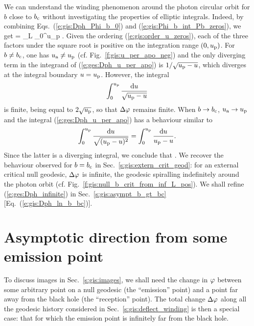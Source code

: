 We can understand the winding phenomenon
around the photon circular orbit for $b$ close to $b_{\rm c}$
without investigating the properties of elliptic integrals.
Indeed, by combining Eqs.~(\ref{e:gis:Dph_Phi_b_0}) and (\ref{e:gis:Phi_b_int_Pb_zeros}),
we get
\be \label{e:ges:Dph_u_per_apo}
    \Delta\ph = \eps_L  \int_0^{u_{\rm p}}
     .
\ee
Given the ordering (\ref{e:gis:order_u_zeros}), each of the
three factors under the square root is positive on the integration range
$(0,u_{\rm p})$. For $b\not=b_{\rm c}$, one has $u_{\rm a}\not=u_{\rm p}$
(cf. Fig.~\ref{f:gis:u_per_apo_neg})
and
the only diverging term in the integrand of (\ref{e:ges:Dph_u_per_apo})
is $1/\sqrt{u_{\rm p} - u}$, which
diverges at the integral boundary $u=u_{\rm p}$. However, the integral
\[
    \int_0^{u_{\rm p}}
    \frac{\mathrm{d} u}{\sqrt{u_{\rm p} - u}}
\]
is finite, being equal to $2\sqrt{u_{\rm p}}$, so that $\Delta\varphi$ remains
finite. When $b\to b_{\rm c}$,
$u_{\rm a} \to u_{\rm p}$ and the integral (\ref{e:ges:Dph_u_per_apo})
has a behaviour similar to
\[
     \int_0^{u_{\rm p}}
    \frac{\mathrm{d} u}{\sqrt{(u_{\rm p} - u)^2}} = \int_0^{u_{\rm p}}
    \frac{\mathrm{d} u}{u_{\rm p} - u} .
\]
Since the latter is a diverging integral, we conclude that
\be \label{e:ges:Dph_infinite}
    .
\ee
We recover the behaviour observed for $b=b_{\rm c}$ in
Sec.~\ref{s:gis:extern_crit_geod}: for
an external critical null geodesic,
$\Delta\varphi$ is infinite, the geodesic spiralling indefinitely around the
photon orbit (cf. Fig.~\ref{f:gis:null_b_crit_from_inf_L_pos}).
We shall refine (\ref{e:ges:Dph_infinite}) in Sec.~\ref{s:gis:asympt_b_gt_bc}
[Eq.~(\ref{e:gis:Dph_ln_b_bc})].


\section{Asymptotic direction from some emission point} \label{s:gis:asymp}

To discuss images in Sec.~\ref{s:gis:images},
we shall need the change in $\varphi$ between some
arbitrary point on a null geodesic (the ``emission'' point)
and a point far away from the black hole (the ``reception'' point).
The total change $\Delta\varphi$ along all the geodesic history
considered in Sec.~\ref{s:gis:deflect_winding} is then a special case: that for which the emission point is
infinitely far from the black hole.

